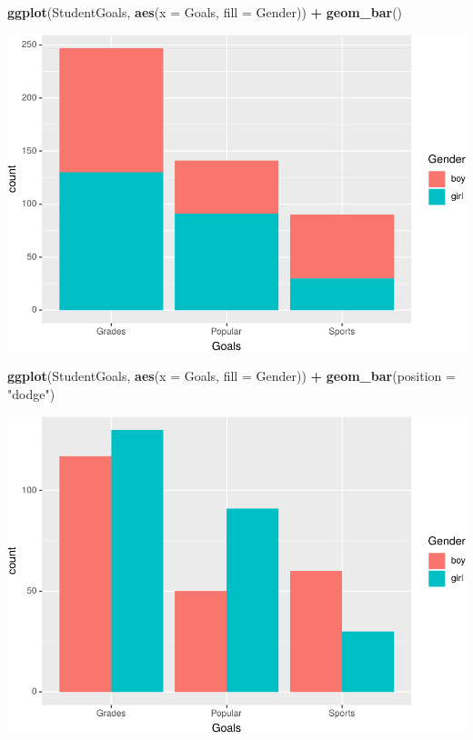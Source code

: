 \documentclass[]{krantz}
\makeatletter
\newenvironment{Shaded}{\begin{snugshade}}{\end{snugshade}}
\newcommand{\DataTypeTok}[1]{\textcolor[rgb]{0.27,0.27,0.27}{#1}}
\newcommand{\KeywordTok}[1]{\textcolor[rgb]{0.27,0.27,0.27}{\textbf{#1}}}
\newcommand{\NormalTok}[1]{#1}
\newcommand{\OperatorTok}[1]{\textcolor[rgb]{0.43,0.43,0.43}{\textbf{#1}}}
\newcommand{\StringTok}[1]{\textcolor[rgb]{0.5,0.5,0.5}{#1}}
\newenvironment{kframe}{%
\medskip{}
\setlength{\fboxsep}{.8em}
 \def\at@end@of@kframe{}%
 \ifinner\ifhmode%
  \def\at@end@of@kframe{\end{minipage}}%
  \begin{minipage}{\columnwidth}%
 \fi\fi%
 \def\FrameCommand##1{\hskip\@totalleftmargin \hskip-\fboxsep
 \colorbox{shadecolor}{##1}\hskip-\fboxsep
     \hskip-\linewidth \hskip-\@totalleftmargin \hskip\columnwidth}%
 \MakeFramed {\advance\hsize-\width
   \@totalleftmargin\z@ \linewidth\hsize
   \@setminipage}}%
 {\par\unskip\endMakeFramed%
 \at@end@of@kframe}
\renewenvironment{Shaded}{\begin{kframe}}{\end{kframe}}
\makeatother
\begin{document}
\begin{Shaded}
\begin{Highlighting}[]
\KeywordTok{ggplot}\NormalTok{(StudentGoals, }\KeywordTok{aes}\NormalTok{(}\DataTypeTok{x =}\NormalTok{ Goals, }\DataTypeTok{fill =}\NormalTok{ Gender)) }\OperatorTok{+}\StringTok{ }\KeywordTok{geom_bar}\NormalTok{()}
\end{Highlighting}
\end{Shaded}

\includegraphics{bookdown_files/figure-latex/unnamed-chunk-78-2.pdf}

\begin{Shaded}
\begin{Highlighting}[]
\KeywordTok{ggplot}\NormalTok{(StudentGoals, }\KeywordTok{aes}\NormalTok{(}\DataTypeTok{x =}\NormalTok{ Goals, }\DataTypeTok{fill =}\NormalTok{ Gender)) }\OperatorTok{+}\StringTok{ }
\StringTok{    }\KeywordTok{geom_bar}\NormalTok{(}\DataTypeTok{position =} \StringTok{"dodge"}\NormalTok{)}
\end{Highlighting}
\end{Shaded}

\includegraphics{bookdown_files/figure-latex/unnamed-chunk-78-3.pdf}
\end{document}
